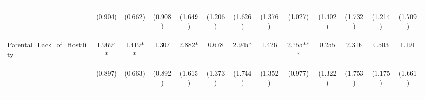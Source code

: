 \begin{tabular}{lcccccccccccc}
 & \begin{footnotesize}(0.904)\end{footnotesize} & \begin{footnotesize}(0.662)\end{footnotesize} & \begin{footnotesize}(0.908)\end{footnotesize} & \begin{footnotesize}(1.649)\end{footnotesize} & \begin{footnotesize}(1.206)\end{footnotesize} & \begin{footnotesize}(1.626)\end{footnotesize} & \begin{footnotesize}(1.376)\end{footnotesize} & \begin{footnotesize}(1.027)\end{footnotesize} & \begin{footnotesize}(1.402)\end{footnotesize} & \begin{footnotesize}(1.732)\end{footnotesize} & \begin{footnotesize}(1.214)\end{footnotesize} & \begin{footnotesize}(1.709)\end{footnotesize}\\
\noalign{\smallskip}Parental_Lack_of_Hostility & 1.969** & 1.419** & 1.307 & 2.882* & 0.678 & 2.945* & 1.426 & 2.755*** & 0.255 & 2.316 & 0.503 & 1.191\\
 & \begin{footnotesize}(0.897)\end{footnotesize} & \begin{footnotesize}(0.663)\end{footnotesize} & \begin{footnotesize}(0.892)\end{footnotesize} & \begin{footnotesize}(1.615)\end{footnotesize} & \begin{footnotesize}(1.373)\end{footnotesize} & \begin{footnotesize}(1.744)\end{footnotesize} & \begin{footnotesize}(1.352)\end{footnotesize} & \begin{footnotesize}(0.977)\end{footnotesize} & \begin{footnotesize}(1.322)\end{footnotesize} & \begin{footnotesize}(1.753)\end{footnotesize} & \begin{footnotesize}(1.175)\end{footnotesize} & \begin{footnotesize}(1.661)\end{footnotesize}\\

\end{tabular}

